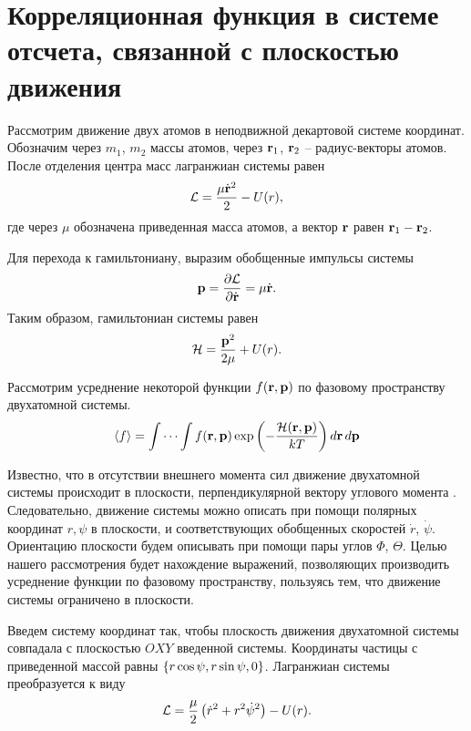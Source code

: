 \section{Корреляционная функция в системе отсчета, связанной с плоскостью движения}

Рассмотрим движение двух атомов в неподвижной декартовой системе координат. Обозначим через $m_1$, $m_2$ массы атомов, через $\mathbf{r}_1$, $\mathbf{r}_2$ -- радиус-векторы атомов. После отделения центра масс лагранжиан системы равен 
\begin{gather}
    \mathcal{L} = \frac{\mu \dot{\mathbf{r}}^2}{2} - U( r ),
\end{gather}
где через $\mu$ обозначена приведенная масса атомов, а вектор $\mathbf{r}$ равен $\mathbf{r}_1 - \mathbf{r}_2$. \par
Для перехода к гамильтониану, выразим обобщенные импульсы системы
\begin{gather}
    \mathbf{p} = \frac{\partial \mathcal{L}}{\partial \dot{\mathbf{r}}} = \mu \dot{\mathbf{r}}. \label{two-atom-laboratory-momenta}
\end{gather}
Таким образом, гамильтониан системы равен
\begin{gather}
    \mathcal{H} = \frac{\mathbf{p}^2}{2\mu} + U( r ).
\end{gather}

Рассмотрим усреднение некоторой функции $f(\mathbf{r}, \mathbf{p})$ по фазовому пространству двухатомной системы. 
\begin{gather}
    \langle f \rangle = \idotsint f(\mathbf{r}, \mathbf{p}) \exp \left( -\frac{\mathcal{H}(\mathbf{r},\mathbf{p})}{kT} \right) d \mathbf{r} \, d\mathbf{p} \label{two-atom-mean}
\end{gather}

Известно, что в отсутствии внешнего момента сил движение двухатомной системы происходит в плоскости, перпендикулярной вектору углового момента \cite{goldstein}. Следовательно, движение системы можно описать при помощи полярных координат $r, \psi$ в плоскости, и соответствующих обобщенных скоростей $\dot{r}$, $\dot{\psi}$. Ориентацию плоскости будем описывать при помощи пары углов $\Phi$, $\Theta$. Целью нашего рассмотрения будет нахождение выражений, позволяющих производить усреднение функции по фазовому пространству, пользуясь тем, что движение системы ограничено в плоскости. \par
    Введем систему координат так, чтобы плоскость движения двухатомной системы совпадала с плоскостью $OXY$ введенной системы. Координаты частицы с приведенной массой равны $\left\{ r \cos \psi, r \sin \psi, 0 \right\}$. Лагранжиан системы преобразуется к виду 
\begin{gather}
    \mathcal{L} = \frac{\mu}{2} \left( \dot{r}^2 + r^2 \dot{\psi}^2 \right) - U(r). \label{two-atom-plane-lagrangian}
\end{gather}

